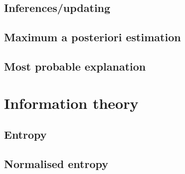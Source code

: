 \subsection{Inferences/updating}
\subsection{Maximum a posteriori estimation}
\subsection{Most probable explanation}
\section{Information theory}
\subsection{Entropy}
\subsection{Normalised entropy}